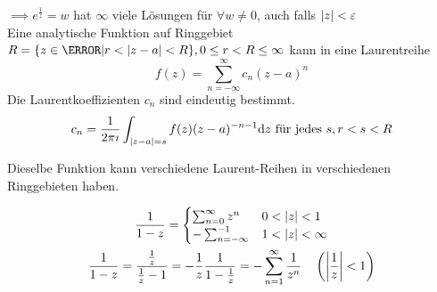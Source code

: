 $\implies e^{\frac{1}{z}} = w$ hat $\infty$ viele Lösungen für $\forall w \neq 0$, auch falls $\abs{z} < \varepsilon$\\
Eine analytische Funktion auf Ringgebiet $R = \{ z \in \C | r < \abs{z-a} < R \}, 0 \leq r < R \leq \infty$ kann in eine Laurentreihe
\[ f(z) = \sum_{n=-\infty}^{\infty} c_n (z-a)^n \]
Die Laurentkoeffizienten $c_n$ sind eindeutig bestimmt.
\[ c_n = \frac{1}{2\pi\imath} \int_{\abs{z-a} = s} f(z) (z-a)^{-n-1} \dd z \text{ für jedes } s , r < s < R \]
\begin{bem}
	Dieselbe Funktion kann verschiedene Laurent-Reihen in verschiedenen Ringgebieten haben.
\end{bem}
\begin{bsp*}
	\begin{gather*}
		\frac{1}{1-z} = \begin{cases}
			\sum_{n=0}^{\infty} z^n &0 < \abs{z} < 1 \\
			-\sum_{n=-\infty}^{-1} &1 < \abs{z} < \infty
		\end{cases} \\
		\frac{1}{1-z} = \frac{\frac{1}{z}}{\frac{1}{z} - 1} = -\frac{1}{z} \frac{1}{1 - \frac{1}{z}} = -\sum_{n=1}^{\infty} \frac{1}{z^n} \quad \left( \abs{\frac{1}{z}} < 1 \right)
	\end{gather*}
\end{bsp*}


